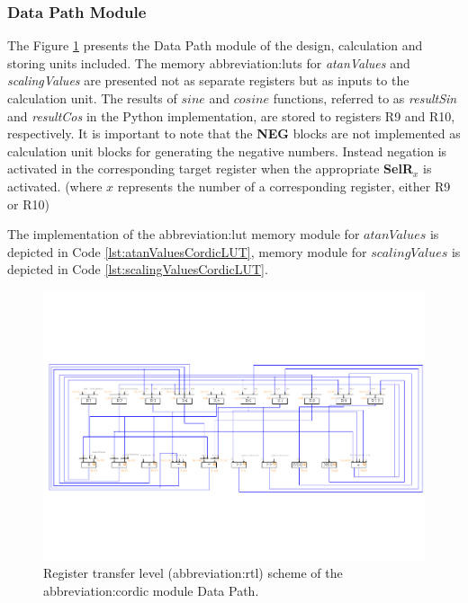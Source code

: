 \documentclass[a4paper, twoside, 11pt]{article}
\begin{document}
        \subsubsection{Data Path Module}
            The Figure \ref{fig:cordic-rtl} presents the Data Path module of the design, calculation and storing units included. The memory \gls{abbreviation:lut}s for \textit{atanValues} and \textit{scalingValues} are presented not as separate registers but as inputs to the calculation unit. The results of $sine$ and $cosine$ functions, referred to as \textit{resultSin} and \textit{resultCos} in the Python implementation, are stored to registers R9 and R10, respectively. It is important to note that the \textbf{NEG} blocks are not implemented as calculation unit blocks for generating the negative numbers. Instead negation is activated in the corresponding target register when the appropriate \textbf{SelR$_x$} is activated. (where $x$ represents the number of a corresponding register, either R9 or R10)\par
            The implementation of the \gls{abbreviation:lut} memory module for $atanValues$ is depicted in Code \ref{lst:atanValuesCordicLUT}, memory module for $scalingValues$ is depicted in Code \ref{lst:scalingValuesCordicLUT}.
            \begin{figure}[htbp!]
                \centering
                \includegraphics[width=1\textwidth]{src/pdf/cordic-rtl.pdf}
                \caption{Register transfer level (\gls{abbreviation:rtl}) scheme of the \gls{abbreviation:cordic} module Data Path.}
                \label{fig:cordic-rtl}
            \end{figure}
            
\end{document}
